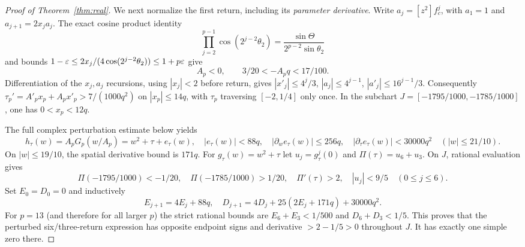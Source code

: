 \begin{proof}[Proof of Theorem~\ref{thm:real}]
We next normalize the first return, including its
\emph{parameter derivative}.  Write $a_j=[z^2]f_c^j$,
with $a_1=1$ and $a_{j+1}=2x_ja_j$.
The exact cosine product identity
\[
 \prod_{j=2}^{p-1}\cos(2^{j-2}\theta_2)
       =\frac{\sin\Theta}{2^{p-2}\sin\theta_2}
\]
and bounds $1-\varepsilon\le
2x_j/(4\cos(2^{j-2}\theta_2))\le1+p\varepsilon$
give
\begin{equation}\label{eq:A-bds}
 A_p<0,\qquad 3/20<-A_pq<17/100.
\end{equation}
Differentiation of the $x_j,a_j$ recursions,
using $|x_j|<2$ before return, gives
$|x'_j|\le4^j/3$, $|a_j|\le4^{j-1}$,
$|a'_j|\le16^{j-1}/3$.
Consequently $\tau_p'=A'_px_p+A_px'_p
>7/(1000q^2)$ on $|x_p|\le14q$,
with $\tau_p$ traversing $[-2,1/4]$ only once.
In the subchart
$J=[-1795/1000,-1785/1000]$,
one has $0<x_p<12q$.

The full complex perturbation estimate below yields
\[
 h_\tau(w)=A_pG_p(w/A_p)=w^2+\tau+e_\tau(w),\quad
 |e_\tau(w)|<88q,\quad
 |\partial_we_\tau(w)|\le256q,\quad
 |\partial_\tau e_\tau(w)|<30000q^2
 \quad(|w|\le21/10).
\]
On $|w|\le19/10$, the spatial derivative bound is
$171q$.  For $g_\tau(w)=w^2+\tau$ let
$u_j=g_\tau^j(0)$ and $\Pi(\tau)=u_6+u_3$.
On $J$, rational evaluation gives
\[
 \Pi(-1795/1000)<-1/20,\quad
 \Pi(-1785/1000)>1/20,\quad
 \Pi'(\tau)>2,\quad
 |u_j|<9/5\quad(0\le j\le6).
\]
Set $E_0=D_0=0$ and inductively
\begin{equation}\label{eq:two-errors}
 E_{j+1}=4E_j+88q,\quad
 D_{j+1}=4D_j+25(2E_j+171q)+30000q^2.
\end{equation}
For $p=13$ (and therefore for all larger $p$)
the strict rational bounds are
$E_6+E_3<1/500$ and $D_6+D_3<1/5$.
This proves that the perturbed six/three-return
expression has opposite endpoint signs
and derivative $>2-1/5>0$ throughout $J$.
It has exactly one simple zero there.


\end{proof}
